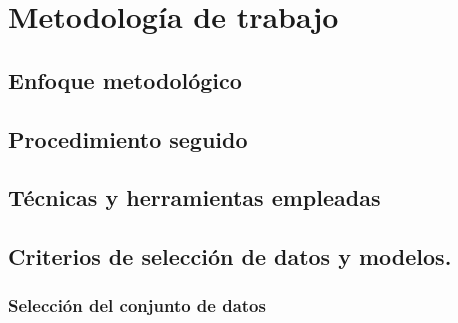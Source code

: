 \chapter{Metodología de trabajo}
\label{ch:metodologia}

\section{Enfoque metodológico}


\section{Procedimiento seguido}


\section{Técnicas y herramientas empleadas}


\section{Criterios de selección de datos y modelos.}

\subsection{Selección del conjunto de datos}
\label{subsec:select_dataset}

